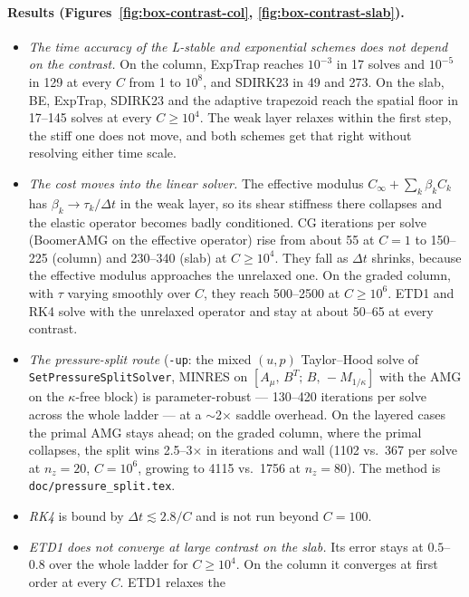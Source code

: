 \documentclass[11pt]{article}
\numberwithin{equation}{section}
\newcommand{\code}[1]{\texttt{#1}}
\begin{document}
\paragraph{Results (Figures~\ref{fig:box-contrast-col}, \ref{fig:box-contrast-slab}).}
\begin{itemize}[leftmargin=*]
\item \emph{The time accuracy of the L-stable and exponential schemes does
  not depend on the contrast.} On the column, ExpTrap reaches $10^{-3}$
  in 17 solves and $10^{-5}$ in 129 at every $C$ from 1 to $10^8$, and
  SDIRK23 in 49 and 273. On the slab, BE, ExpTrap, SDIRK23 and the
  adaptive trapezoid reach the spatial floor in 17--145 solves at every
  $C\ge10^4$. The weak layer relaxes within the first step, the stiff one
  does not move, and both schemes get that right without resolving
  either time scale.
\item \emph{The cost moves into the linear solver.} The effective
  modulus $C_\infty+\sum_k\beta_kC_k$ has $\beta_k\to\tau_k/\Delta t$ in
  the weak layer, so its shear stiffness there collapses and the elastic
  operator becomes badly conditioned. CG iterations per solve (BoomerAMG
  on the effective operator) rise from about 55 at $C=1$ to 150--225
  (column) and 230--340 (slab) at $C\ge10^4$. They fall as $\Delta t$
  shrinks, because the effective modulus approaches the unrelaxed one. On
  the graded column, with $\tau$ varying smoothly over $C$, they reach
  500--2500 at $C\ge10^6$. ETD1 and RK4 solve with the unrelaxed operator
  and stay at about 50--65 at every contrast.
\item \emph{The pressure-split route} (\code{-up}: the mixed $(u,p)$
  Taylor--Hood solve of \code{SetPressureSplitSolver}, MINRES on
  $[A_\mu,\,B^T;\,B,\,-M_{1/\kappa}]$ with the AMG on the $\kappa$-free
  block) is parameter-robust --- 130--420 iterations per solve across the
  whole ladder --- at a $\sim$2$\times$ saddle overhead. On the layered
  cases the primal AMG stays ahead; on the graded column, where the
  primal collapses, the split wins 2.5--3$\times$ in iterations and wall
  (1102 vs.\ 367 per solve at $n_z=20$, $C=10^6$, growing to 4115 vs.\
  1756 at $n_z=80$). The method is \code{doc/pressure\_split.tex}.
\item \emph{RK4} is bound by $\Delta t\lesssim2.8/C$ and is not run beyond
  $C=100$.
\item \emph{ETD1 does not converge at large contrast on the slab.} Its
  error stays at $0.5$--$0.8$ over the whole ladder for $C\ge10^4$. On the
  column it converges at first order at every $C$. ETD1 relaxes the

\end{itemize}
\end{document}
